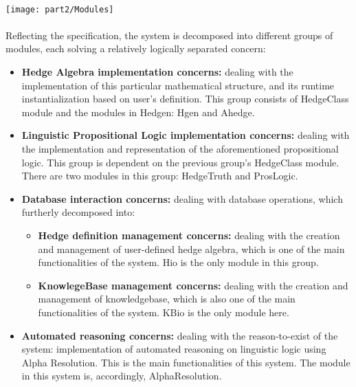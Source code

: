 \documentclass[../gr-final.tex]{subfiles}
\begin{document}
\paragraph{}
\texttt{[image: part2/Modules]}
\paragraph{} Reflecting the specification, the system is decomposed
into different groups of modules, each solving a relatively logically separated
concern:
\begin{itemize}
\item {\bfseries Hedge Algebra implementation concerns:} dealing with
  the implementation of this particular mathematical structure, and
  its runtime instantialization based on user's definition. This
  group consists of HedgeClass module and the modules in Hedgen:
  Hgen and Ahedge.
\item {\bfseries Linguistic Propositional Logic implementation concerns:} dealing
  with the implementation and representation of the aforementioned
  propositional logic. This group is dependent on the previous group's
  HedgeClass module. There are two modules in this group: HedgeTruth
  and ProsLogic.
\item {\bfseries Database interaction concerns:} dealing with
        database operations, which furtherly decomposed into:
        \begin{itemize}
          \item {\bfseries Hedge definition management concerns:}
                  dealing with the creation and management of
                  user-defined hedge algebra, which is one of the
                  main functionalities of the system. Hio is the
                  only module in this group. 
          \item {\bfseries KnowlegeBase management concerns:}
                  dealing with the creation and management of
                  knowledgebase, which is also one of the main
                  functionalities of the system. KBio is the only
                  module here.
        \end{itemize}
\item {\bfseries Automated reasoning concerns:} dealing with the
  reason-to-exist of the system: implementation of automated reasoning
  on linguistic logic using Alpha Resolution. This is the main
  functionalities of this system. The module in this system is,
  accordingly, AlphaResolution.
\end{itemize}
\end{document}
